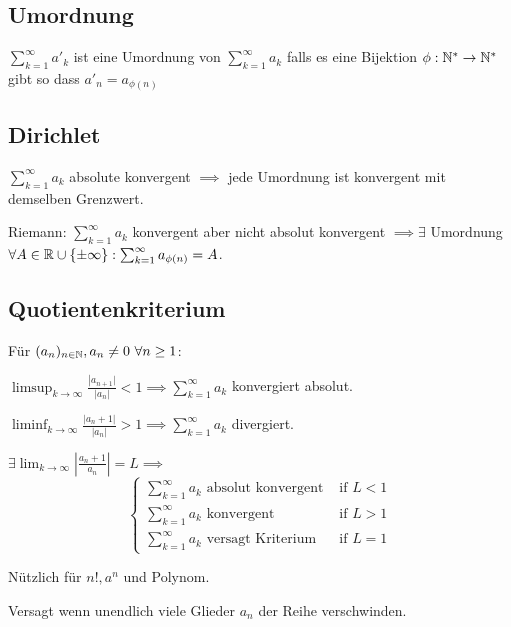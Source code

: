 \subsection{Umordnung}
$\sum_{k=1}^{\infty} a'_k$ ist eine Umordnung von $\sum_{k=1}^{\infty} a_k$ falls es eine Bijektion $\phi : \mathbb{N}^* \to \mathbb{N}^*$ gibt so dass $a'_n = a_{\phi(n)}$

\subsection{Dirichlet}
$\sum_{k=1}^{\infty} a_k$ absolute konvergent $\implies$ jede Umordnung ist konvergent mit demselben Grenzwert.
\begin{compactdesc}
\item[Riemann:] $\sum_{k=1}^{\infty} a_k$ konvergent aber nicht absolut konvergent $\implies \exists $ Umordnung $\forall A \in \mathbb{R} \cup \{\pm \infty\}: \sum_{k=1}^{\infty} a_{\phi(n)} = A $.
\end{compactdesc}

\subsection{Quotientenkriterium}
Für $(a_n)_{n \in \mathbb{N}}, a_n \neq 0 \ \forall n \ge 1$:
\begin{compactenum}
    \item $\limsup_{k \to \infty} \frac{\left| a_{n+1} |}{\left| a_n \right| } < 1 \implies \sum_{k=1}^{\infty} a_k$ konvergiert absolut.
    \item $\liminf_{k \to \infty} \frac{\left| a_n + 1 \right|}{\left| a_n \right| } > 1 \implies \sum_{k=1}^{\infty} a_k$ divergiert.
\end{compactenum}
\begin{compactitem}
    \item $\exists \lim_{k \to \infty} \left| \frac{a_n + 1}{a_n} \right| =  L \implies$
        \[
        \begin{cases}
            \sum_{k=1}^{\infty} a_k \text{ absolut konvergent} & \text{ if } L < 1\\
            \sum_{k=1}^{\infty} a_k \text{ konvergent} & \text{ if } L > 1\\
            \sum_{k=1}^{\infty} a_k \text{ versagt Kriterium} & \text{ if } L = 1
        \end{cases}
        \] 
    \item Nützlich für $n!, a^n$ und Polynom.
    \item Versagt wenn unendlich viele Glieder $a_n$ der Reihe verschwinden.
\end{compactitem}

